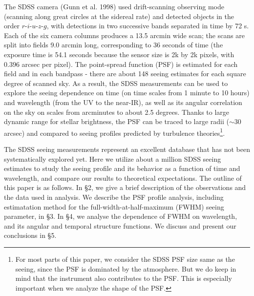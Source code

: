 The SDSS camera (Gunn et al. 1998) used drift-scanning observing mode (scanning along great circles
at the sidereal rate) and detected objects in the order 
$r$-$i$-$u$-$z$-$g$, with detections in two successive bands separated in time by 72 s. Each of the six camera
columns produces a 13.5 arcmin wide scan; the scans are split into fields 9.0 arcmin long, corresponding
to 36 seconds of time (the exposure time is 54.1 seconds because the sensor size is 2k by 2k pixels,
with 0.396 arcsec per pixel). 
The point-spread function (PSF) is estimated for each field and in each bandpass - there are about 
148 seeing estimates for each square degree of scanned sky. As a result, the SDSS measurements can
be used to explore the seeing dependence on time (on time scales from 1 minute to 10 hours) and 
wavelength (from the UV to the near-IR), as well as its angular correlation on the sky on scales from 
arcminutes to about 2.5 degrees. Thanks to large dynamic range for stellar brightness, the PSF can 
be traced to large radii ($\sim$30 arcsec) and compared to seeing profiles predicted by turbulence
theories\footnote{For most parts of this paper, we consider the SDSS PSF size
same as the seeing, since the PSF is dominated by the atmosphere. But we do
keep in mind that the instrument also contributes to the PSF. This is
especially important when we analyze the shape of the PSF.}.

The SDSS seeing measurements represent an excellent database that has not been systematically 
explored yet. Here we utilize about a million SDSS seeing estimates to study the seeing profile 
and its behavior as a function of time and wavelength, and compare our results to theoretical 
expectations. The outline of this paper is as follows. In \S2, we give a brief description of the 
observations and the data used in analysis. We describe the PSF profile analysis, 
including estimatation method for the full-width-at-half-maximum (FWHM) seeing
parameter, in \S3. In \S4, we analyse the dependence of FWHM on wavelength, and its angular 
and temporal structure functions. We discuss and present our conclusions in \S5. 